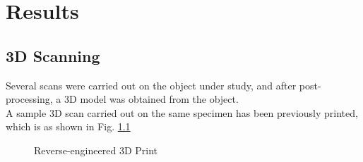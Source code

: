 \chapter{Results}
\section{3D Scanning}
Several scans were carried out on the object under study, and after post-processing, a 3D model was obtained from the object.\\
A sample 3D scan carried out on the same specimen has been previously printed, which is as shown in Fig. \ref{fig:result}
\begin{figure}[!h]%
	\centering
	\qquad
	\caption{Reverse-engineered 3D Print}%
	\label{fig:result}%
\end{figure}
